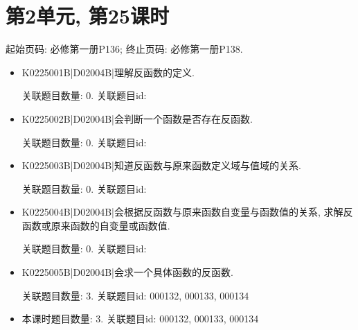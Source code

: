 \section*{第2单元, 第25课时}
起始页码: 必修第一册P136; 终止页码: 必修第一册P138.
\begin{itemize}
\item K0225001B|D02004B|理解反函数的定义.

关联题目数量: 0. 关联题目id: 

\item K0225002B|D02004B|会判断一个函数是否存在反函数.

关联题目数量: 0. 关联题目id: 

\item K0225003B|D02004B|知道反函数与原来函数定义域与值域的关系.

关联题目数量: 0. 关联题目id: 

\item K0225004B|D02004B|会根据反函数与原来函数自变量与函数值的关系, 求解反函数或原来函数的自变量或函数值.

关联题目数量: 0. 关联题目id: 

\item K0225005B|D02004B|会求一个具体函数的反函数.

关联题目数量: 3. 关联题目id: 000132, 000133, 000134

\item 本课时题目数量: 3. 关联题目id: 000132, 000133, 000134

\end{itemize}

